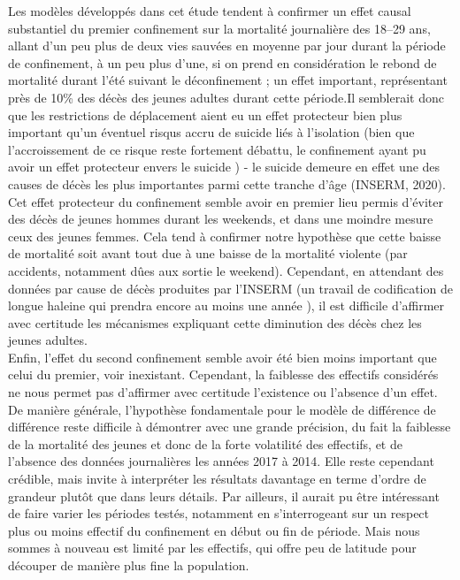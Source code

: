 \documentclass[titlepage]{article}
\begin{document}
Les modèles développés dans cet étude tendent à confirmer un effet causal substantiel du premier confinement sur la mortalité journalière des 18–29 ans, allant d'un peu plus de deux vies sauvées en moyenne par jour durant la période de confinement, à un peu plus d'une, si on prend en considération le rebond de mortalité durant l'été suivant le déconfinement ; un effet important, représentant près de 10\% des décès des jeunes adultes durant cette période.Il semblerait donc que les restrictions de déplacement aient eu un effet protecteur bien plus important qu'un éventuel risqus accru de suicide liés à l'isolation (bien que l'accroissement de ce risque reste fortement débattu, le confinement ayant pu avoir un effet protecteur envers le suicide \parencite{letourneur_suicide_2022,olie_hospitalizations_2021}) - le suicide demeure en effet une des causes de décès les plus importantes parmi cette tranche d'âge (INSERM, 2020).  \\

Cet effet protecteur du confinement semble avoir en premier lieu permis d'éviter des décès de jeunes hommes durant les weekends, et dans une moindre mesure ceux des jeunes femmes. Cela tend à confirmer notre hypothèse que cette baisse de mortalité soit avant tout due à une baisse de la mortalité violente (par accidents, notamment dûes aux sortie le weekend). Cependant, en attendant des données par cause de décès produites par l'INSERM (un travail de codification de longue haleine qui prendra encore au moins une année \parencite{gastineau_lepidemie_2022}), il est difficile d'affirmer avec certitude les mécanismes expliquant cette diminution des décès chez les jeunes adultes. \\

Enfin, l'effet du second confinement semble avoir été bien moins important que celui du premier, voir inexistant. Cependant, la faiblesse des effectifs considérés ne nous permet pas d'affirmer avec certitude l'existence ou l'absence d'un effet. De manière générale, l'hypothèse fondamentale pour le modèle de différence de différence reste difficile à démontrer avec une grande précision, du fait la faiblesse de la mortalité des jeunes et donc de la forte volatilité des effectifs, et de l'absence des données journalières les années 2017 à 2014. Elle reste cependant crédible, mais invite à interpréter les résultats davantage en terme d'ordre de grandeur plutôt que dans leurs détails. Par ailleurs, il aurait pu être intéressant de faire varier les périodes testés, notamment en s'interrogeant sur un respect plus ou moins effectif du confinement en début ou fin de période. Mais nous sommes à nouveau est limité par les effectifs, qui offre peu de latitude pour découper de manière plus fine la population.
\end{document}
